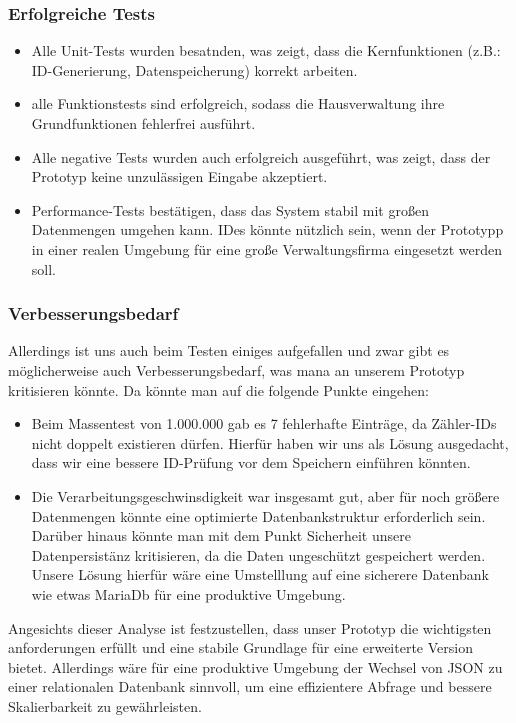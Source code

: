 \subsubsection{Erfolgreiche Tests}

\begin{itemize}
    \item Alle Unit-Tests wurden besatnden, was zeigt, dass die Kernfunktionen (z.B.: ID-Generierung, Datenspeicherung) korrekt arbeiten.
    \item alle Funktionstests sind erfolgreich, sodass die Hausverwaltung ihre Grundfunktionen fehlerfrei ausführt.
    \item Alle negative Tests wurden auch erfolgreich ausgeführt, was zeigt, dass der Prototyp keine unzulässigen Eingabe akzeptiert.
    \item Performance-Tests bestätigen, dass das System stabil mit großen Datenmengen umgehen kann. IDes könnte nützlich sein, wenn der Prototypp in einer realen Umgebung für eine große Verwaltungsfirma eingesetzt werden soll.
\end{itemize}

\subsubsection{Verbesserungsbedarf}
Allerdings ist uns auch beim Testen einiges aufgefallen und zwar gibt es möglicherweise auch Verbesserungsbedarf, was mana an unserem Prototyp kritisieren könnte.
Da könnte man auf die folgende Punkte eingehen:
\begin{itemize}
    \item Beim Massentest von 1.000.000 gab es 7 fehlerhafte Einträge, da Zähler-IDs nicht doppelt existieren dürfen. Hierfür haben wir uns als Lösung ausgedacht, dass wir eine bessere ID-Prüfung vor dem Speichern einführen könnten.
    \item Die Verarbeitungsgeschwinsdigkeit war insgesamt gut, aber für noch größere Datenmengen könnte eine optimierte Datenbankstruktur erforderlich sein. Darüber hinaus könnte man mit dem Punkt Sicherheit unsere Datenpersistänz kritisieren, da die Daten ungeschützt gespeichert werden.
    Unsere Lösung hierfür wäre eine Umstelllung auf eine sicherere Datenbank wie etwas MariaDb für eine produktive Umgebung.
\end{itemize} 


Angesichts dieser Analyse ist festzustellen, dass unser Prototyp die wichtigsten anforderungen erfüllt und eine stabile Grundlage für eine erweiterte Version bietet.
Allerdings wäre für eine produktive Umgebung der Wechsel von JSON zu einer relationalen Datenbank sinnvoll, um eine effizientere Abfrage und bessere Skalierbarkeit zu gewährleisten.
